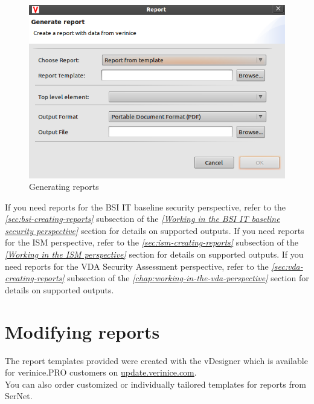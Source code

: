 \documentclass[a4paper,10pt]{book}
\begin{document}
\begin{figure}[htb!]
  \centering
  \includegraphics[scale=.45]{Screenshot/Reportdialog-en.png}
  \caption{\label{Create report} Generating reports}
\end{figure}
If you need reports for the BSI IT baseline security perspective, refer to the {\em \ref {sec:bsi-creating-reports} } subsection of the
{\em \ref{Working in the BSI IT baseline security perspective} } section for details on supported outputs.
\newline
If you need reports for the ISM perspective, refer to the {\em \ref {sec:ism-creating-reports} } subsection of the {\em \ref{Working in the ISM perspective} } section for
details on supported outputs.
\newline
If you need reports for the VDA Security Assessment perspective, refer to the {\em \ref {sec:vda-creating-reports} } subsection of the {\em \ref{chap:working-in-the-vda-perspective} } section for details on supported outputs.

\section{Modifying reports}
The report templates provided were created with the vDesigner which is
available for verinice.PRO customers on
\href{https://update.verinice.com}{update.verinice.com}.\\

You can also order customized or individually tailored templates for
reports from SerNet.
\end{document}
